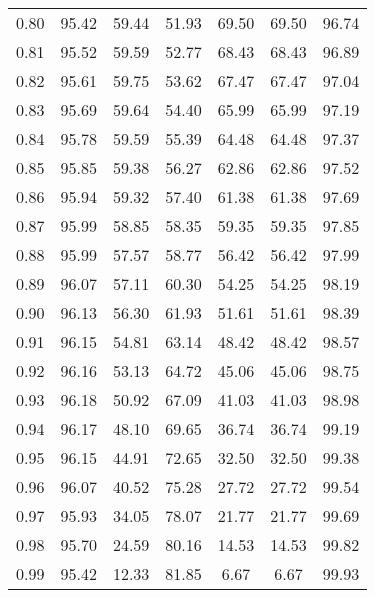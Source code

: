 \begin{tabular}{|c|c|c|c|c|c|c|}
      0.80 &     95.42 &     59.44 &      51.93 &   69.50 &      69.50 &         96.74 \\
      0.81 &     95.52 &     59.59 &      52.77 &   68.43 &      68.43 &         96.89 \\
      0.82 &     95.61 &     59.75 &      53.62 &   67.47 &      67.47 &         97.04 \\
      0.83 &     95.69 &     59.64 &      54.40 &   65.99 &      65.99 &         97.19 \\
      0.84 &     95.78 &     59.59 &      55.39 &   64.48 &      64.48 &         97.37 \\
      0.85 &     95.85 &     59.38 &      56.27 &   62.86 &      62.86 &         97.52 \\
      0.86 &     95.94 &     59.32 &      57.40 &   61.38 &      61.38 &         97.69 \\
      0.87 &     95.99 &     58.85 &      58.35 &   59.35 &      59.35 &         97.85 \\
      0.88 &     95.99 &     57.57 &      58.77 &   56.42 &      56.42 &         97.99 \\
      0.89 &     96.07 &     57.11 &      60.30 &   54.25 &      54.25 &         98.19 \\
      0.90 &     96.13 &     56.30 &      61.93 &   51.61 &      51.61 &         98.39 \\
      0.91 &     96.15 &     54.81 &      63.14 &   48.42 &      48.42 &         98.57 \\
      0.92 &     96.16 &     53.13 &      64.72 &   45.06 &      45.06 &         98.75 \\
      0.93 &     96.18 &     50.92 &      67.09 &   41.03 &      41.03 &         98.98 \\
      0.94 &     96.17 &     48.10 &      69.65 &   36.74 &      36.74 &         99.19 \\
      0.95 &     96.15 &     44.91 &      72.65 &   32.50 &      32.50 &         99.38 \\
      0.96 &     96.07 &     40.52 &      75.28 &   27.72 &      27.72 &         99.54 \\
      0.97 &     95.93 &     34.05 &      78.07 &   21.77 &      21.77 &         99.69 \\
      0.98 &     95.70 &     24.59 &      80.16 &   14.53 &      14.53 &         99.82 \\
      0.99 &     95.42 &     12.33 &      81.85 &    6.67 &       6.67 &         99.93 \\
\bottomrule
\end{tabular}
